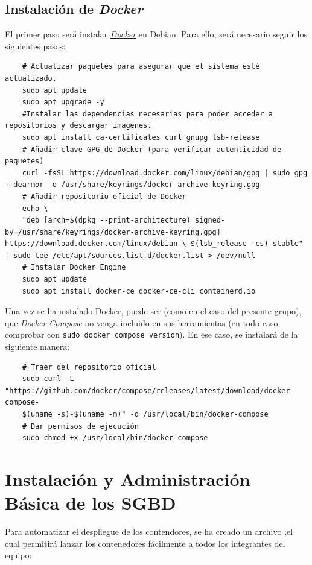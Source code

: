 \documentclass{article}
\begin{document}
\subsection{Instalación de \textit{Docker}}\label{subsec:Instalación de Docker}
El primer paso será instalar \textit{\textcolor{blue}{\href{https://www.docker.com/}{Docker}}} en Debian. Para ello, será necesario seguir los siguientes pasos:

\begin{lstlisting}
    # Actualizar paquetes para asegurar que el sistema esté actualizado.
    sudo apt update
    sudo apt upgrade -y
    #Instalar las dependencias necesarias para poder acceder a repositorios y descargar imagenes.
    sudo apt install ca-certificates curl gnupg lsb-release
    # Añadir clave GPG de Docker (para verificar autenticidad de paquetes)
    curl -fsSL https://download.docker.com/linux/debian/gpg | sudo gpg --dearmor -o /usr/share/keyrings/docker-archive-keyring.gpg
    # Añadir repositorio oficial de Docker
    echo \
    "deb [arch=$(dpkg --print-architecture) signed-by=/usr/share/keyrings/docker-archive-keyring.gpg] https://download.docker.com/linux/debian \ $(lsb_release -cs) stable" | sudo tee /etc/apt/sources.list.d/docker.list > /dev/null
    # Instalar Docker Engine
    sudo apt update
    sudo apt install docker-ce docker-ce-cli containerd.io
\end{lstlisting}

Una vez se ha instalado Docker, puede ser (como en el caso del presente grupo), que \textit{Docker Compose} no venga incluido en sus herramientas (en todo caso, comprobar con \texttt{sudo docker compose version}). En ese caso, se instalará de la siguiente manera: 
\begin{lstlisting}
    # Traer del repositorio oficial
    sudo curl -L "https://github.com/docker/compose/releases/latest/download/docker-compose-
    $(uname -s)-$(uname -m)" -o /usr/local/bin/docker-compose
    # Dar permisos de ejecución
    sudo chmod +x /usr/local/bin/docker-compose
\end{lstlisting}
\newpage

\section{Instalación y Administración Básica de los SGBD}
Para automatizar el despliegue de los contendores, se ha creado un archivo ,el cual permitirá lanzar los contenedores fácilmente a todos los integrantes del equipo:
\end{document}
